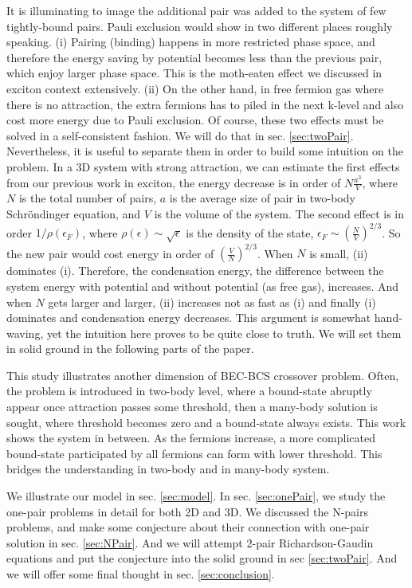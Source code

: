 \documentclass[5p,twocolumn]{elsarticle}
\begin{document}
It is illuminating to image the additional pair was added to the system of few tightly-bound pairs.   Pauli exclusion would show in two different places roughly speaking.  (i) Pairing (binding) happens in more restricted phase space, and therefore the energy saving by potential becomes less than the previous pair, which enjoy larger phase space.  This is the moth-eaten effect we discussed in exciton context extensively\cite{CobosonPhysicsReports}.  (ii) On the other hand, in free fermion gas where there is no attraction, the extra fermions has to piled in the next k-level and also cost more energy due to Pauli exclusion.  Of course, these two effects must be solved in a self-consistent fashion.  We will do that in sec. \ref{sec:twoPair}.  Nevertheless, it is useful to separate them in order to build some intuition on the problem.  In a 3D system with strong attraction, we can estimate the first effects from our previous work in exciton, the energy decrease is in order of $N\frac{a^3}{V}$, where $N$ is the total number of pairs, $a$ is the average size of pair in two-body Schr\"{o}ndinger equation, and $V$ is the volume of the system. The second effect is in order $1/\rho(\epsilon_F)$, where $\rho(\epsilon)\sim\sqrt{\epsilon}$ is the density of the state, $\epsilon_F\sim\left(\frac{N}{V}\right)^{2/3}$. So the new pair would cost energy in order of $\left(\frac{V}{N}\right)^{2/3}$. When $N$ is small, (ii) dominates (i). Therefore, the condensation energy, the difference between the system energy with potential and without potential (as free gas), increases.  And when $N$ gets larger and larger, (ii) increases not as fast as (i) and finally (i) dominates and condensation energy decreases.    This argument is somewhat hand-waving, yet the intuition here proves to be quite close to truth.  We will set them in solid ground in the following parts of the paper. 

This study illustrates another dimension of BEC-BCS crossover problem.  Often, the problem is introduced in two-body level, where a bound-state abruptly appear once attraction passes some threshold, then a many-body solution is sought, where threshold becomes zero  and a bound-state always exists. This work shows the system in between. As the fermions increase, a more complicated bound-state participated by all fermions can form with lower threshold.  This bridges the understanding in two-body and in many-body system. 


We illustrate our model in sec. \ref{sec:model}.  In sec. \ref{sec:onePair}, we study the one-pair problems in detail for both 2D and 3D.  We discussed the N-pairs problems, and make some conjecture about their connection with one-pair solution  in sec. \ref{sec:NPair}.  And we will attempt 2-pair Richardson-Gaudin equations and put the conjecture into the solid ground in sec \ref{sec:twoPair}.  And we will offer some final thought in sec. \ref{sec:conclusion}.
\end{document}
